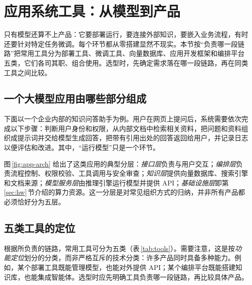 \section{应用系统工具：从模型到产品}
\label{sec:tools}

\begin{guide}
\begin{minipage}[c]{0.66\linewidth}
\noindent 只有模型还算不上产品：它要部署运行，要连接外部知识，要嵌入业务流程，有时还要针对特定任务微调。每个环节都从零搭建显然不现实。本节按“负责哪一段链路”把常用工具分为部署工具、微调工具、向量数据库、应用开发框架和编排平台五类，它们各司其职、组合使用。选型时，先确定需求落在哪一段链路，再在同类工具之间比较。
\end{minipage}\hfill
\begin{minipage}[c]{0.3\linewidth}\centering{}\end{minipage}
\end{guide}

\subsection{一个大模型应用由哪些部分组成}

下面以一个企业内部的知识问答助手为例。用户在网页上提问后，系统需要依次完成以下步骤：判断用户身份和权限，从内部文档中检索相关资料，把问题和资料组织成提示词并交给模型生成回答，把带有引用出处的回答返回给用户，并记录日志以便评估和改进。其中，“运行模型”只是一个环节。

图\,\ref{fig:app-arch} 给出了这类应用的典型分层：\emph{接口层}负责与用户交互；\emph{编排层}负责流程控制、权限校验、工具调用与安全审查；\emph{知识层}提供向量数据库、搜索引擎和文档来源；\emph{模型服务层}由推理引擎运行模型并提供 API；\emph{基础设施层}即第\,\ref{sec:hw}\,节介绍的算力资源。这一分层是对常见组织方式的归纳，并非所有产品都必须恰好分为五层。



\subsection{五类工具的定位}
\label{subsec:tool-types}

根据所负责的链路，常用工具可分为五类（表\,\ref{tab:tools}）。需要注意，这是按\emph{功能定位}划分的分类，而非严格互斥的技术分类：许多产品同时具备多种能力。例如，某个部署工具既能管理模型，也能对外提供 API；某个编排平台既能搭建知识库，也能集成智能体。选型时应先明确工具负责哪一段链路，再比较具体产品。

